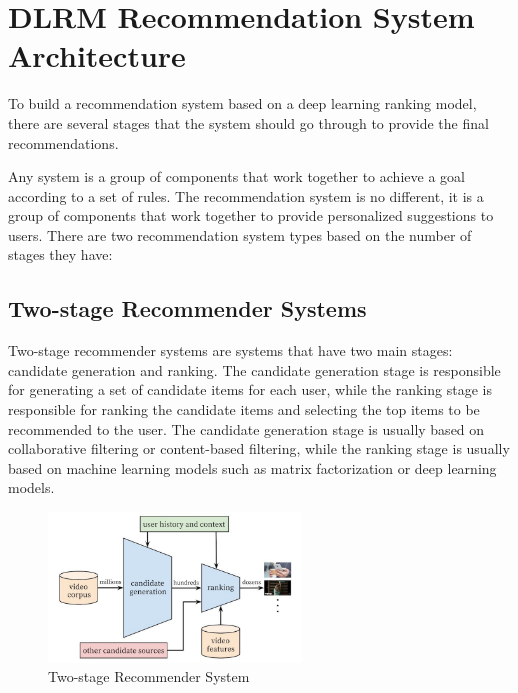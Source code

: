 

\section{DLRM Recommendation System Architecture}

To build a recommendation system based on a deep learning ranking model, there are several stages that the system should go through to provide the final recommendations.

Any system is a group of components that work together to achieve a goal according to a set of rules. The recommendation system is no different, it is a group of components that work together to provide personalized suggestions to users. There are two recommendation system types based on the number of stages they have:
\subsection{Two-stage Recommender Systems}
Two-stage recommender systems are systems that have two main stages: candidate generation and ranking. The candidate generation stage is responsible for generating a set of candidate items for each user, while the ranking stage is responsible for ranking the candidate items and selecting the top items to be recommended to the user. The candidate generation stage is usually based on collaborative filtering or content-based filtering, while the ranking stage is usually based on machine learning models such as matrix factorization or deep learning models.\cite{MultiStageRecSys}
\begin{figure}[H]
    \centering
    \includegraphics[width=0.6\textwidth]{assets/Two_stage_rec_sys.jpg}
    \caption[Two-stage Recommender System]{Two-stage Recommender System\cite{MultiStageRecSys}}
\end{figure}
